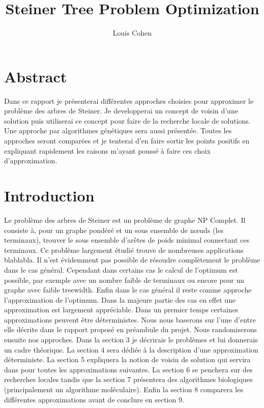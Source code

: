\documentclass[10pt,a4paper]{article}
\author{Louis Cohen}
\title{Steiner Tree Problem Optimization}
\begin{document}
\maketitle	

\tableofcontents

\section{Abstract}

Dans ce rapport je présenterai différentes approches choisies pour approximer le problème des arbres de Steiner. Je developperai un concept de voisin d'une solution puis utiliserai ce concept pour faire de la recherche locale de solutions. Une approche par algorithmes génétiques sera aussi présentée. Toutes les approches seront comparées et je tenterai d'en faire sortir les points positifs en expliquant rapidement les raisons m'ayant poussé à faire ces choix d'approximation.

\section{Introduction}

Le problème des arbres de Steiner est un problème de graphe NP Complet. Il consiste à, pour un graphe pondéré et un sous ensemble de nœuds (les terminaux), trouver le sous ensemble d’arêtes de poids minimal connectant ces terminaux. Ce problème largement étudié trouve de nombreuses applications blablabla. Il n'est évidemment pas possible de résoudre complètement le problème dans le cas général. Cependant dans certains cas le calcul de l'optimum est possible, par exemple avec un nombre faible de terminaux ou encore pour un graphe avec faible treewidth. Enfin dans le cas général il reste comme approche l'approximation de l'optimum. Dans la majeure partie des cas en effet une approximation est largement appréciable. Dans un premier temps certaines approximations peuvent être déterministes.  Nous nous baserons sur l'une d'entre elle décrite dans le rapport proposé en préambule du projet. Nous randomiserons ensuite nos approches. Dans la section 3 je décrirais le problèmes et lui donnerais un cadre théorique. La section 4 sera dédiée à la description d'une approximation déterministe. La section 5 expliquera la notion de voisin de solution qui servira dans pour toutes les approximations suivantes. La section 6 se penchera sur des recherches locales tandis que la section 7 présentera des algorithmes biologiques (principalement un algorithme moléculaire). Enfin la section 8 comparera les différentes approximations avant de conclure en section 9.
\end{document}
